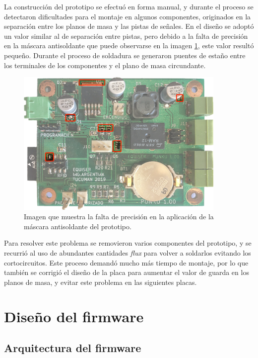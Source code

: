 La construcción del prototipo se efectuó en forma manual, y durante el proceso se detectaron dificultades para el montaje en algunos componentes, originados en la separación entre los planos de masa y las pistas de señales. En el diseño se adoptó un valor similar al de separación entre pistas, pero debido a la falta de precisión en la máscara antisoldante que puede observarse en la imagen \ref{fig:ProblemasMascara}, este valor resultó pequeño. Durante el proceso de soldadura se generaron puentes de estaño entre los terminales de los componentes y el plano de masa circundante.

\begin{figure}[ht]
	\centering
	\includegraphics[width=0.9\textwidth]{Figures/LadoComponentes.png}
	\caption[Problemas con la  máscara antisoldante del prototipo]{Imagen que muestra la falta de precisión en la aplicación de la máscara antisoldante del prototipo.}
	\label{fig:ProblemasMascara}
\end{figure}

Para resolver este problema se removieron varios componentes del prototipo, y se recurrió al uso de abundantes cantidades \emph{flux} para volver a soldarlos evitando los cortocircuitos. Este proceso demandó mucho más tiempo de montaje, por lo que también se corrigió el diseño de la placa para aumentar el valor de guarda en los planos de masa, y evitar este problema en las siguientes placas. 

\section{Diseño del firmware}
\label{sec:firmware}

\subsection{Arquitectura del firmware}
\label{sub:Arquitectura}

